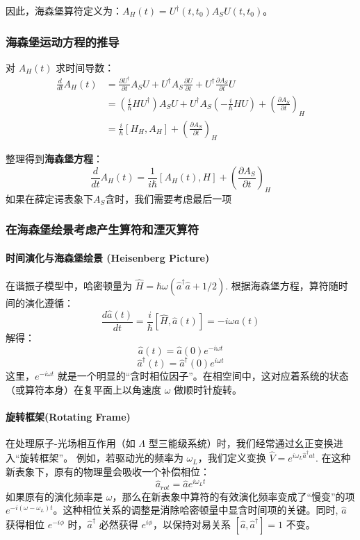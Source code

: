 因此，海森堡算符定义为：$A_H(t) = U^\dagger(t, t_0) A_S U(t, t_0)$。

\subsubsection{海森堡运动方程的推导}
对 $A_H(t)$ 求时间导数：
\begin{align}
	\frac{d}{dt} A_H(t) &= \frac{\partial U^\dagger}{\partial t} A_S U + U^\dagger A_S \frac{\partial U}{\partial t} + U^\dagger \frac{\partial A_S}{\partial t} U \\
	&= \left( \frac{i}{\hbar} H U^\dagger \right) A_S U + U^\dagger A_S \left( -\frac{i}{\hbar} H U \right) + \left( \frac{\partial A_S}{\partial t} \right)_H \\
	&= \frac{i}{\hbar} [H_H, A_H] + \left( \frac{\partial A_S}{\partial t} \right)_H
\end{align}

整理得到\textbf{海森堡方程}：
\begin{equation}
	\frac{d}{dt} A_H(t) = \frac{1}{i\hbar} [A_H(t), H] + \left( \frac{\partial A_S}{\partial t} \right)_H
\end{equation}	
如果在薛定谔表象下\(A_S\)含时，我们需要考虑最后一项

\subsubsection{在海森堡绘景考虑产生算符和湮灭算符}

\paragraph{时间演化与海森堡绘景 (Heisenberg Picture)}
在谐振子模型中，哈密顿量为 $\hat{H} = \hbar\omega (\hat{a}^\dagger \hat{a} + 1/2)$. 根据海森堡方程，算符随时间的演化遵循：
\[\frac{d\hat{a}(t)}{dt} = \frac{i}{\hbar} [\hat{H}, \hat{a}(t)] = -i\omega \hat{a}(t)\]
解得：
\[\hat{a}(t) = \hat{a}(0)e^{-i\omega t}\]
\[\hat{a}^\dagger(t) = \hat{a}^\dagger(0)e^{i\omega t}\]
这里，$e^{-i\omega t}$ 就是一个明显的``含时相位因子''。在相空间中，这对应着系统的状态（或算符本身）在复平面上以角速度 $\omega$ 做顺时针旋转。

\paragraph{旋转框架(Rotating Frame)}
在处理原子-光场相互作用（如 $\Lambda$ 型三能级系统）时，我们经常通过幺正变换进入``旋转框架''。
例如，若驱动光的频率为 $\omega_L$，我们定义变换 $\hat{V} = e^{i\omega_L \hat{a}^\dagger \hat{a} t}$.
在这种新表象下，原有的物理量会吸收一个补偿相位：
$$\hat{a}_{rot} = \hat{a} e^{i\omega_L t}$$
如果原有的演化频率是 $\omega$，那么在新表象中算符的有效演化频率变成了“慢变”的项 $e^{-i(\omega - \omega_L)t}$。这种相位关系的调整是消除哈密顿量中显含时间项的关键。同时, $\hat{a}$ 获得相位 $e^{-i\phi}$ 时，$\hat{a}^\dagger$ 必然获得 $e^{i\phi}$，以保持对易关系 $[\hat{a}, \hat{a}^\dagger] = 1$ 不变。
